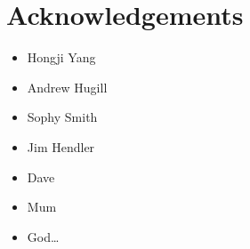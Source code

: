 
\pagestyle{empty}

\chapter{Acknowledgements}


\begin{itemize}
\item Hongji Yang
\item Andrew Hugill
\item Sophy Smith
\item Jim Hendler
\item Dave
\item Mum
\item God\ldots
\end{itemize}

\clearpage
